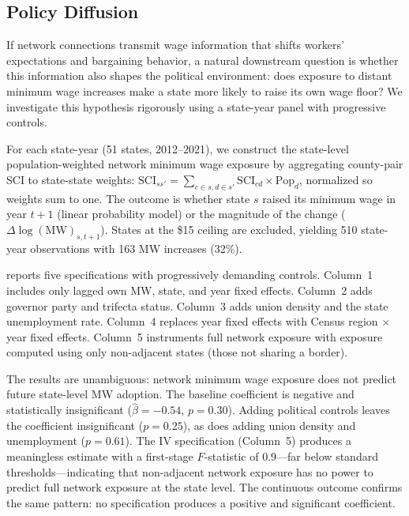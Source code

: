 \documentclass[12pt]{article}
\begin{document}
\subsection{Policy Diffusion}

If network connections transmit wage information that shifts workers' expectations and bargaining behavior, a natural downstream question is whether this information also shapes the political environment: does exposure to distant minimum wage increases make a state more likely to raise its own wage floor? We investigate this hypothesis rigorously using a state-year panel with progressive controls.

For each state-year (51 states, 2012--2021), we construct the state-level population-weighted network minimum wage exposure by aggregating county-pair SCI to state-state weights: $\text{SCI}_{ss'} = \sum_{c \in s, d \in s'} \text{SCI}_{cd} \times \text{Pop}_d$, normalized so weights sum to one. The outcome is whether state $s$ raised its minimum wage in year $t+1$ (linear probability model) or the magnitude of the change ($\Delta\log(\text{MW})_{s,t+1}$). States at the \$15 ceiling are excluded, yielding 510 state-year observations with 163 MW increases (32\%).

 reports five specifications with progressively demanding controls. Column~1 includes only lagged own MW, state, and year fixed effects. Column~2 adds governor party and trifecta status. Column~3 adds union density and the state unemployment rate. Column~4 replaces year fixed effects with Census region $\times$ year fixed effects. Column~5 instruments full network exposure with exposure computed using only non-adjacent states (those not sharing a border).

The results are unambiguous: network minimum wage exposure does not predict future state-level MW adoption. The baseline coefficient is negative and statistically insignificant ($\hat{\beta} = -0.54$, $p = 0.30$). Adding political controls leaves the coefficient insignificant ($p = 0.25$), as does adding union density and unemployment ($p = 0.61$). The IV specification (Column~5) produces a meaningless estimate with a first-stage $F$-statistic of 0.9---far below standard thresholds---indicating that non-adjacent network exposure has no power to predict full network exposure at the state level. The continuous outcome confirms the same pattern: no specification produces a positive and significant coefficient.


\end{document}
